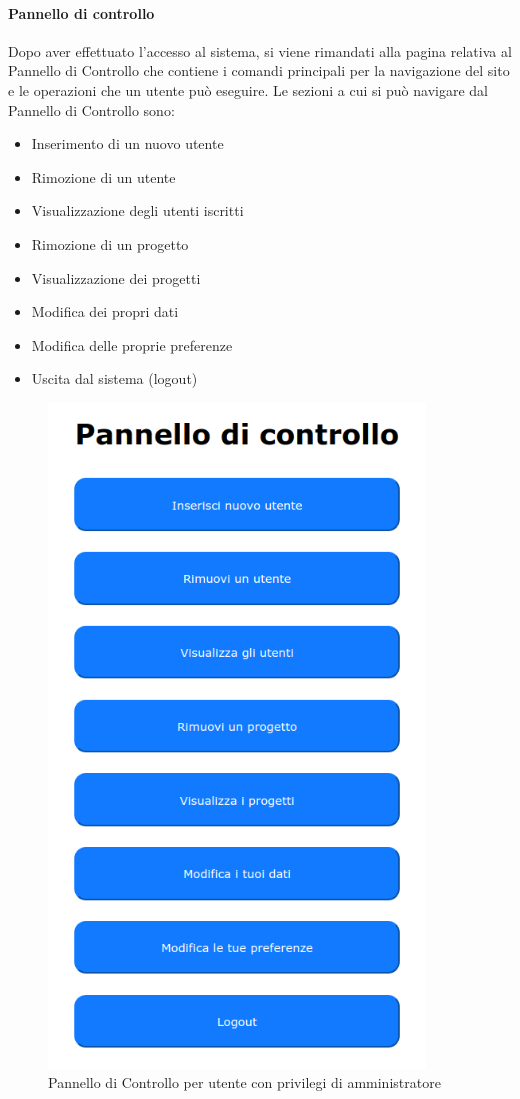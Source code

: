 \paragraph{Pannello di controllo}
Dopo aver effettuato l'accesso al sistema, si viene rimandati alla pagina relativa al Pannello di Controllo che contiene i comandi principali per la navigazione del sito e le operazioni che un utente può eseguire.
Le sezioni a cui si può navigare dal Pannello di Controllo sono:
\begin{itemize}
    \item Inserimento di un nuovo utente
    \item Rimozione di un utente
    \item Visualizzazione degli utenti iscritti
    \item Rimozione di un progetto
    \item Visualizzazione dei progetti
    \item Modifica dei propri dati
    \item Modifica delle proprie preferenze
	\item Uscita dal sistema (logout)
\end{itemize}
\begin{figure}[H]
    \centering
    \includegraphics[width=10cm]{img/admin_panel_1.png}
    \caption{Pannello di Controllo per utente con privilegi di amministratore}
\end{figure}

